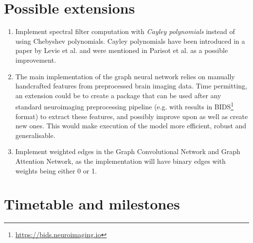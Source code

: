 \documentclass[12pt,a4paper,twoside]{article}
\begin{document}
\section*{Possible extensions}
\begin{enumerate}[label=PE\arabic*.]
  \item Implement spectral filter computation with \textit{Cayley polynomials} instead of using Chebyshev polynomials. Cayley polynomials have been introduced in a paper by Levie et al. \cite{levie2017cayleynets} and were mentioned in Parisot et al. \cite{parisot2018disease} as a possible improvement.
  \item The main implementation of the graph neural network relies on manually handcrafted features from preprocessed brain imaging data. Time permitting, an extension could be to create a package that can be used after any standard neuroimaging preprocessing pipeline (e.g. with results in BIDS\footnote{\url{https://bids.neuroimaging.io}} format) to extract these features, and possibly improve upon as well as create new ones. This would make execution of the model more efficient, robust and generalisable.
  \item Implement weighted edges in the Graph Convolutional Network and Graph Attention Network, as the implementation will have binary edges with weights being either 0 or 1.

\end{enumerate}


\section*{Timetable and milestones}
\label{section:timetable}


\end{document}
